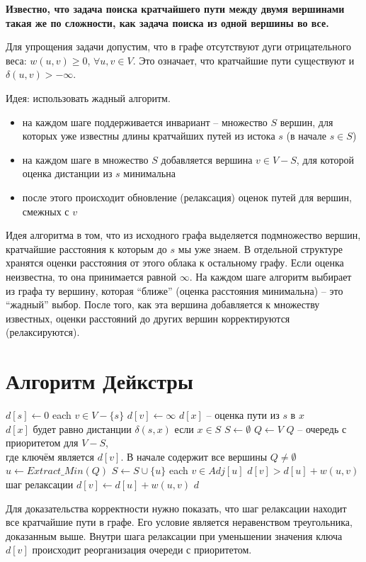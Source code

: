 \documentclass[11pt]{article}
\begin{document}
\textbf{Известно, что задача поиска кратчайшего пути между двумя вершинами такая же по сложности, как задача поиска из одной вершины во все.}

Для упрощения задачи допустим, что в графе отсутствуют дуги отрицательного веса: $w(u, v) \geqslant 0$, $\forall u, v \in V$. Это означает, что кратчайшие пути существуют и $\delta(u, v) > - \infty$.

Идея: использовать жадный алгоритм.
\begin{itemize}
\item на каждом шаге поддерживается инвариант -- множество $S$ вершин, для которых уже известны длины кратчайших путей из истока $s$ (в начале $s \in S$)
\item на каждом шаге в множество $S$ добавляется вершина $v \in V-S$, для которой оценка дистанции из $s$ минимальна
\item после этого происходит обновление (релаксация) оценок путей для вершин, смежных с $v$
\end{itemize}
Идея алгоритма в том, что из исходного графа выделяется подмножество вершин, кратчайшие расстояния к которым до $s$ мы уже знаем. В отдельной структуре хранятся оценки расстояния от этого облака к остальному графу. Если оценка неизвестна, то она принимается равной $\infty$. На каждом шаге алгоритм выбирает из графа ту вершину, которая ``ближе'' (оценка расстояния минимальна) -- это ``жадный'' выбор. После того, как эта вершина добавляется к множеству известных, оценки расстояний до других вершин корректируются (релаксируются).
\section{Алгоритм Дейкстры}
\begin{codebox}
\li $d[s] \gets 0$
\li \For each $v \in V - \{s\}$
\li     \Do $d[v] \gets \infty$ \Comment $d[x]$ -- оценка пути из $s$ в $x$ \\
\Comment $d[x]$ будет равно дистанции $\delta(s, x)$ если $x \in S$
    \End
\li $S \gets \emptyset$
\li $Q \gets V$ \Comment $Q$ -- очередь с приоритетом для $V-S$, \\
\Comment где ключём является $d[v]$. В начале содержит все вершины
\li \While $Q \neq \emptyset$
\li     \Do $u \gets Extract\_Min(Q)$
\li         $S \gets S \cup \{u\}$
\li         \For each $v \in Adj[u]$
\li             \Do \If $d[v] > d[u] + w(u, v)$ \Comment шаг релаксации
\li                 \Then $d[v] \gets d[u] + w(u, v)$
                    \End
            \End
    \End
\li \Return $d$
\end{codebox}
Для доказательства корректности нужно показать, что шаг релаксации находит все кратчайшие пути в графе. Его условие является неравенством треугольника, доказанным выше. Внутри шага релаксации при уменьшении значения ключа $d[v]$ происходит реорганизация очереди с приоритетом.
\end{document}
